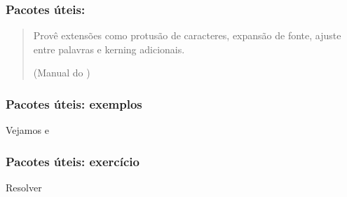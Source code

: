 \begin{frame}
  \frametitle{Pacotes úteis: }
  \LARGE
  \begin{quote}
  Provê extensões como protusão de caracteres, expansão de fonte, ajuste entre
  palavras e kerning adicionais.\par\hfill (Manual do )
  \end{quote}
\end{frame}

\begin{frame}
  \frametitle{Pacotes úteis: exemplos}
  \LARGE
  Vejamos  e
\end{frame}

\begin{frame}
  \frametitle{Pacotes úteis: exercício}
  \LARGE
  Resolver 
\end{frame}
